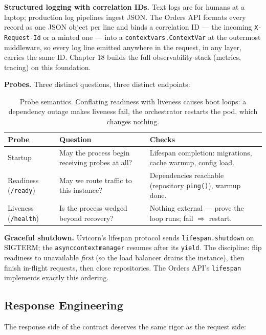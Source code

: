 \textbf{Structured logging with correlation IDs.} Text logs are for humans at
a laptop; production log pipelines ingest JSON. The Orders API formats every
record as one JSON object per line and binds a correlation ID --- the
incoming \texttt{X-Request-Id} or a minted one --- into a
\texttt{contextvars.ContextVar} at the outermost middleware, so every log
line emitted anywhere in the request, in any layer, carries the same ID.
Chapter 18 builds the full observability stack (metrics, tracing) on this
foundation.

\textbf{Probes.} Three distinct questions, three distinct endpoints:

\begin{table}[h]
  \centering
  \small
  \begin{tabularx}{\textwidth}{l X X}
    \toprule
    \textbf{Probe} & \textbf{Question} & \textbf{Checks} \\
    \midrule
    Startup & May the process begin receiving probes at all? & Lifespan completion: migrations, cache warmup, config load. \\
    Readiness (\texttt{/ready}) & May we route traffic to this instance? & Dependencies reachable (repository \texttt{ping()}), warmup done. \\
    Liveness (\texttt{/health}) & Is the process wedged beyond recovery? & Nothing external --- prove the loop runs; fail $\Rightarrow$ restart. \\
    \bottomrule
  \end{tabularx}
  \caption{Probe semantics. Conflating readiness with liveness causes boot
  loops: a dependency outage makes liveness fail, the orchestrator restarts
  the pod, which changes nothing.}
  \label{tab:ch6-probes}
\end{table}

\textbf{Graceful shutdown.} Uvicorn's lifespan protocol sends
\texttt{lifespan.shutdown} on SIGTERM; the \texttt{asynccontextmanager}
resumes after its \texttt{yield}. The discipline: flip readiness to
unavailable \emph{first} (so the load balancer drains the instance), then
finish in-flight requests, then close repositories. The Orders API's
\texttt{lifespan} implements exactly this ordering.

\subsection{Response Engineering}
\label{sec:ch6-responses}

The response side of the contract deserves the same rigor as the request
side:

